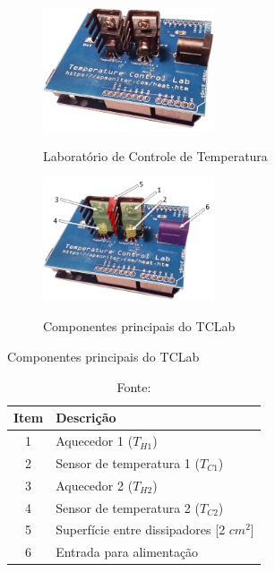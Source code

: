\begin{figure}[h]
	\caption{Laboratório de Controle de Temperatura}
	\begin{center}
		\includegraphics[width=0.45\textwidth]{./5_images/tclab.png} 
		\label{fig:tclab}
	\end{center}
	\centering
\end{figure}

\begin{figure}[h]
	\caption{Componentes principais do TCLab}
	\begin{center}
		\includegraphics[width=0.45\textwidth]{./5_images/tclab_color_numbers.png} 
		\label{fig:tclab_description}
	\end{center}
	\centering
\end{figure}

\begin{table}[h]
	\centering
	\caption{Componentes principais do TCLab}
	\label{tab:componentes_tclabsp}
	\begin{tabular}{cl} \toprule
		{Item}			& {Descrição} 									\\ \midrule
		1		 		& Aquecedor 1 ($T_{H1}$)		 				\\
		2				& Sensor de temperatura 1 ($T_{C1}$)			\\
		3				& Aquecedor 2 ($T_{H2}$)						\\
		4				& Sensor de temperatura 2 ($T_{C2}$)			\\
		5				& Superfície entre dissipadores [2 $cm^2$]		\\
		6				& Entrada para alimentação						\\ \bottomrule
	\end{tabular}
	\caption*{Fonte: }
\end{table}

